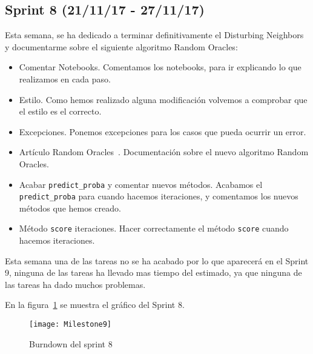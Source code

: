 \subsection{Sprint 8 (21/11/17 - 27/11/17)}
Esta semana, se ha dedicado a terminar definitivamente el Disturbing Neighbors y documentarme sobre el siguiente algoritmo Random Oracles:
\begin{itemize}
\item Comentar Notebooks. Comentamos los notebooks, para ir explicando lo que realizamos en cada paso.
\item Estilo. Como hemos realizado alguna modificación volvemos a comprobar que el estilo es el correcto.
\item Excepciones. Ponemos excepciones para los casos que pueda ocurrir un error.
\item Artículo Random Oracles~\cite{randomoracles}. Documentación sobre el nuevo algoritmo Random Oracles.
\item Acabar \texttt{predict\_proba} y comentar nuevos métodos. Acabamos el \texttt{predict\_proba} para cuando hacemos iteraciones, y comentamos los nuevos métodos que hemos creado.
\item Método \texttt{score} iteraciones. Hacer correctamente el método \texttt{score} cuando hacemos iteraciones.
\end{itemize}

Esta semana una de las tareas no se ha acabado por lo que aparecerá en el Sprint 9, ninguna de las tareas ha llevado mas tiempo del estimado, ya que ninguna de las tareas ha dado muchos problemas.

En la figura~\ref{fig:Milestone9} se muestra el gráfico del Sprint 8.

\begin{figure}
\centering
\texttt{[image: Milestone9]}
\caption{Burndown del sprint 8}
\label{fig:Milestone9}
\end{figure}

